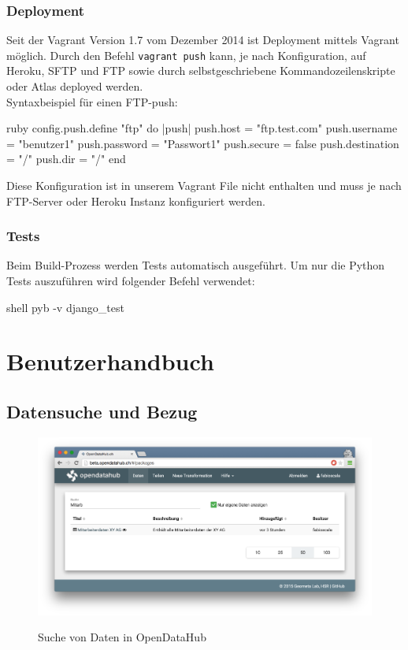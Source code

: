 \subsection{Deployment}
Seit der Vagrant Version 1.7 vom Dezember 2014 ist Deployment mittels Vagrant möglich. Durch den Befehl \texttt{vagrant push} kann, je nach Konfiguration, auf Heroku, SFTP und FTP sowie durch selbstgeschriebene Kommandozeilenskripte oder Atlas deployed werden.
\\Syntaxbeispiel für einen FTP-push: \cite{vagrant-deployment}
\begin{src}{ruby}
config.push.define "ftp" do |push|
  push.host = "ftp.test.com"
  push.username = "benutzer1"
  push.password = "Passwort1"
  push.secure = false
  push.destination = "/"
  push.dir = "/"
end
\end{src}
Diese Konfiguration ist in unserem Vagrant File nicht enthalten und muss je nach FTP-Server oder Heroku Instanz konfiguriert werden.

\subsection{Tests}
Beim Build-Prozess werden Tests automatisch ausgeführt. Um nur die Python Tests auszuführen wird folgender Befehl verwendet:
\begin{src}{shell}
pyb -v django_test
\end{src}


\chapter{Benutzerhandbuch}

\section{Datensuche und Bezug}


\label{sec:sd:daten-suchen}

\begin{figure}[H]
	\centering
	\includegraphics[width=\linewidth]{fig/screenshot-daten-suche}
	\label{fig:sd:screenshot-daten-suche}
	\caption{Suche von Daten in OpenDataHub}
\end{figure}

